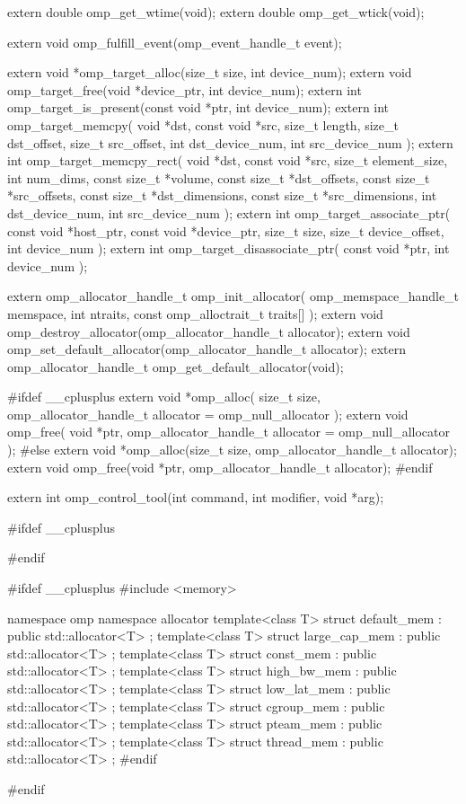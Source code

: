 {\begin{ompcFunction}
{extern double omp_get_wtime(void);
extern double omp_get_wtick(void);

extern void omp_fulfill_event(omp_event_handle_t event);

extern void *omp_target_alloc(size_t size, int device_num);
extern void omp_target_free(void *device_ptr, int device_num);
extern int omp_target_is_present(const void *ptr, int device_num);
extern int omp_target_memcpy(
  void *dst,
  const void *src,
  size_t length,
  size_t dst_offset,
  size_t src_offset,
  int dst_device_num,
  int src_device_num
);
extern int omp_target_memcpy_rect(
  void *dst,
  const void *src,
  size_t element_size,
  int num_dims,
  const size_t *volume,
  const size_t *dst_offsets,
  const size_t *src_offsets,
  const size_t *dst_dimensions,
  const size_t *src_dimensions,
  int dst_device_num,
  int src_device_num
);
extern int omp_target_associate_ptr(
  const void *host_ptr,
  const void *device_ptr,
  size_t size,
  size_t device_offset,
  int device_num
);
extern int omp_target_disassociate_ptr(
  const void *ptr,
  int device_num
);

extern omp_allocator_handle_t omp_init_allocator(
  omp_memspace_handle_t memspace,
  int ntraits,
  const omp_alloctrait_t traits[]
);
extern void omp_destroy_allocator(omp_allocator_handle_t allocator);
extern void omp_set_default_allocator(omp_allocator_handle_t allocator);
extern omp_allocator_handle_t omp_get_default_allocator(void);

#ifdef __cplusplus
extern void *omp_alloc(
  size_t size,
  omp_allocator_handle_t allocator = omp_null_allocator
);
extern void omp_free(
  void *ptr,
  omp_allocator_handle_t allocator = omp_null_allocator
);
#else
extern void *omp_alloc(size_t size, omp_allocator_handle_t allocator);
extern void omp_free(void *ptr, omp_allocator_handle_t allocator);
#endif

extern int omp_control_tool(int command, int modifier, void *arg);

#ifdef __cplusplus
}
#endif

#ifdef __cplusplus
#include <memory>

namespace omp {
  namespace allocator {
    template<class T> struct default_mem : public std::allocator<T> {};
    template<class T> struct large_cap_mem : public std::allocator<T> {};
    template<class T> struct const_mem : public std::allocator<T> {};
    template<class T> struct high_bw_mem : public std::allocator<T> {};
    template<class T> struct low_lat_mem : public std::allocator<T> {};
    template<class T> struct cgroup_mem : public std::allocator<T> {};
    template<class T> struct pteam_mem : public std::allocator<T> {};
    template<class T> struct thread_mem : public std::allocator<T> {};
  }
}
#endif

#endif
\end{ompcFunction}} %

